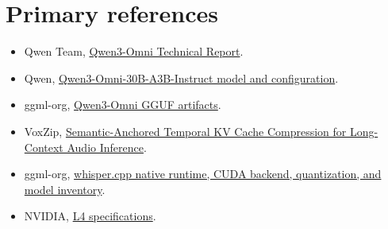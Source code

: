 \documentclass[10pt,letterpaper]{article}
\begin{document}
\section*{Primary references}
\small
\begin{itemize}
    \item Qwen Team, \href{https://arxiv.org/abs/2509.17765}{Qwen3-Omni Technical Report}.
    \item Qwen, \href{https://huggingface.co/Qwen/Qwen3-Omni-30B-A3B-Instruct}{Qwen3-Omni-30B-A3B-Instruct model and configuration}.
    \item ggml-org, \href{https://huggingface.co/ggml-org/Qwen3-Omni-30B-A3B-Instruct-GGUF}{Qwen3-Omni GGUF artifacts}.
    \item VoxZip, \href{https://arxiv.org/abs/2608.08569}{Semantic-Anchored Temporal KV Cache Compression for Long-Context Audio Inference}.
    \item ggml-org, \href{https://github.com/ggml-org/whisper.cpp}{whisper.cpp native runtime, CUDA backend, quantization, and model inventory}.
    \item NVIDIA, \href{https://www.nvidia.com/en-us/data-center/l4/}{L4 specifications}.
\end{itemize}
\end{document}

